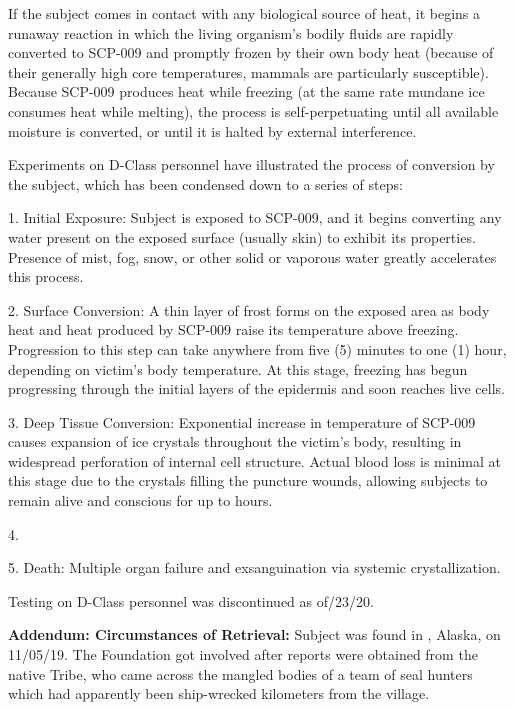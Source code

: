 If the subject comes in contact with any biological source of heat, it begins a runaway reaction in which the living organism's bodily fluids are rapidly converted to SCP-009 and promptly frozen by their own body heat (because of their generally high core temperatures, mammals are particularly susceptible). Because SCP-009 produces heat while freezing (at the same rate mundane ice consumes heat while melting), the process is self-perpetuating until all available moisture is converted, or until it is halted by external interference.

Experiments on D-Class personnel have illustrated the process of conversion by the subject, which has been condensed down to a series of steps:

1. Initial Exposure: Subject is exposed to SCP-009, and it begins converting any water present on the exposed surface (usually skin) to exhibit its properties. Presence of mist, fog, snow, or other solid or vaporous water greatly accelerates this process.

2. Surface Conversion: A thin layer of frost forms on the exposed area as body heat and heat produced by SCP-009 raise its temperature above freezing. Progression to this step can take anywhere from five (5) minutes to one (1) hour, depending on victim's body temperature. At this stage, freezing has begun progressing through the initial layers of the epidermis and soon reaches live cells.

3. Deep Tissue Conversion: Exponential increase in temperature of SCP-009 causes expansion of ice crystals throughout the victim's body, resulting in widespread perforation of internal cell structure. Actual blood loss is minimal at this stage due to the crystals filling the puncture wounds, allowing subjects to remain alive and conscious for up to  hours.

4. \expunged

5. Death: Multiple organ failure and exsanguination via systemic crystallization.

Testing on D-Class personnel was discontinued as of/23/20.

\textbf{Addendum: Circumstances of Retrieval:} Subject was found in , Alaska, on 11/05/19. The Foundation got involved after reports were obtained from the native  Tribe, who came across the mangled bodies of a team of seal hunters which had apparently been ship-wrecked  kilometers from the village.

